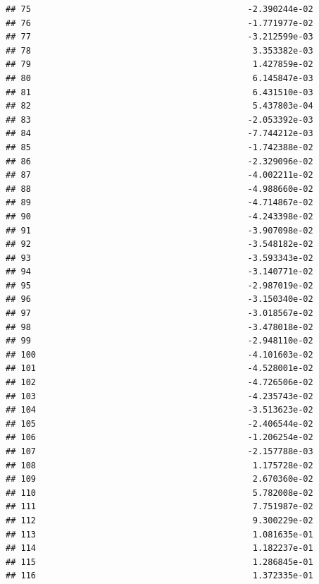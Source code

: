 \documentclass[
]{article}
\begin{document}
\begin{verbatim}
## 75                                           -2.390244e-02
## 76                                           -1.771977e-02
## 77                                           -3.212599e-03
## 78                                            3.353382e-03
## 79                                            1.427859e-02
## 80                                            6.145847e-03
## 81                                            6.431510e-03
## 82                                            5.437803e-04
## 83                                           -2.053392e-03
## 84                                           -7.744212e-03
## 85                                           -1.742388e-02
## 86                                           -2.329096e-02
## 87                                           -4.002211e-02
## 88                                           -4.988660e-02
## 89                                           -4.714867e-02
## 90                                           -4.243398e-02
## 91                                           -3.907098e-02
## 92                                           -3.548182e-02
## 93                                           -3.593343e-02
## 94                                           -3.140771e-02
## 95                                           -2.987019e-02
## 96                                           -3.150340e-02
## 97                                           -3.018567e-02
## 98                                           -3.478018e-02
## 99                                           -2.948110e-02
## 100                                          -4.101603e-02
## 101                                          -4.528001e-02
## 102                                          -4.726506e-02
## 103                                          -4.235743e-02
## 104                                          -3.513623e-02
## 105                                          -2.406544e-02
## 106                                          -1.206254e-02
## 107                                          -2.157788e-03
## 108                                           1.175728e-02
## 109                                           2.670360e-02
## 110                                           5.782008e-02
## 111                                           7.751987e-02
## 112                                           9.300229e-02
## 113                                           1.081635e-01
## 114                                           1.182237e-01
## 115                                           1.286845e-01
## 116                                           1.372335e-01

\end{verbatim}
\end{document}
